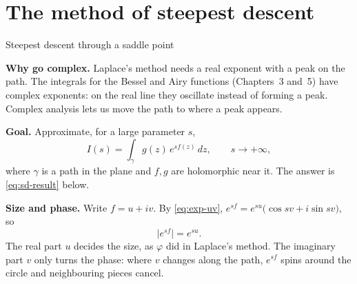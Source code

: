 \documentclass[11pt]{beamer}
\begin{document}
\section{The method of steepest descent}

\begin{frame}[allowframebreaks=1.00]{Steepest descent through a saddle point}
\footnotesize

\textbf{Why go complex.} Laplace's method needs a real exponent with a peak on the path. The integrals
for the Bessel and Airy functions (Chapters~3 and~5) have complex exponents: on the real line they
oscillate instead of forming a peak. Complex analysis lets us move the path to where a peak appears.

\textbf{Goal.} Approximate, for a large parameter \(s\),
\begin{equation}
  I(s)=\int_\gamma g(z)\,e^{s f(z)}\,dz,\qquad s\to+\infty,
  \label{eq:sd-int}
\end{equation}
where \(\gamma\) is a path in the plane and \(f,g\) are holomorphic near it. The answer is
\eqref{eq:sd-result} below.

\textbf{Size and phase.} Write \(f=u+iv\). By \eqref{eq:exp-uv},
\(e^{sf}=e^{su}\bigl(\cos sv+i\sin sv\bigr)\), so
\[
  \bigl|e^{sf}\bigr|=e^{su}.
\]
The real part \(u\) decides the size, as \(\varphi\) did in Laplace's method. The imaginary part \(v\) only
turns the phase: where \(v\) changes along the path, \(e^{sf}\) spins around the circle and neighbouring
pieces cancel.


\end{frame}
\end{document}
